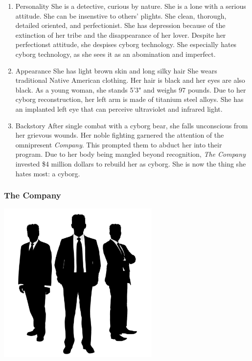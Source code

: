 \documentclass[11pt]{article}
\begin{document}
\begin{enumerate}
\item Personality
\label{sec:org103c0be}
She is a detective, curious by nature. She is a lone with a serious attitude. She can be insenstive to others' plights. She clean, thorough, detailed oriented, and perfectionist. She has depression because of the extinction of her tribe and the disappearance of her lover. Despite her perfectionst attitude, she despises cyborg technology. She especially hates cyborg technology, as she sees it as an abomination and imperfect.

\item Appearance
\label{sec:org427633f}
She has light brown skin and long silky hair She wears traditional Native American clothing. Her hair is black and her eyes are also black. As a young woman, she stands 5'3" and weighs 97 pounds. Due to her cyborg reconstruction, her left arm is made of titanium steel alloys. She has an implanted left eye that can perceive ultraviolet and infrared light.

\item Backstory
\label{sec:orga135a37}
After single combat with a cyborg bear, she falls unconscious from her grievous wounds. Her noble fighting garnered the attention of the omnipresent \emph{Company}. This prompted them to abduct her into their program. Due to her body being mangled beyond recognition, \emph{The Company} invested \$4 million dollars to rebuild her as cyborg. She is now the thing she hates most: a cyborg.
\end{enumerate}

\subsubsection{The Company}
\label{sec:org5f57e8c}
\begin{center}
\includegraphics[width=8cm]{./img/the-company.png}
\end{center}
\end{document}
